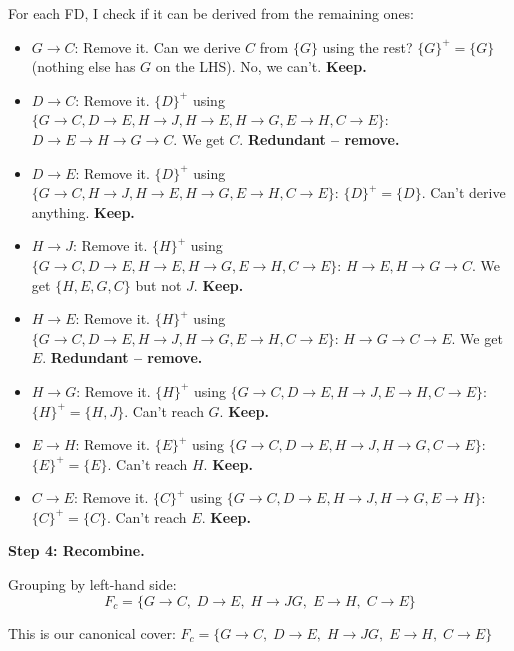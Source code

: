 \documentclass[11pt]{article}
\begin{document}
For each FD, I check if it can be derived from the remaining ones:

\begin{itemize}
  \item $G \to C$: Remove it. Can we derive $C$ from $\{G\}$ using the rest? $\{G\}^+ = \{G\}$ (nothing else has $G$ on the LHS). No, we can't. \textbf{Keep.}

  \item $D \to C$: Remove it. $\{D\}^+$ using $\{G \to C, D \to E, H \to J, H \to E, H \to G, E \to H, C \to E\}$: $D \to E \to H \to G \to C$. We get $C$. \textbf{Redundant -- remove.}

  \item $D \to E$: Remove it. $\{D\}^+$ using $\{G \to C, H \to J, H \to E, H \to G, E \to H, C \to E\}$: $\{D\}^+ = \{D\}$. Can't derive anything. \textbf{Keep.}

  \item $H \to J$: Remove it. $\{H\}^+$ using $\{G \to C, D \to E, H \to E, H \to G, E \to H, C \to E\}$: $H \to E, H \to G \to C$. We get $\{H, E, G, C\}$ but not $J$. \textbf{Keep.}

  \item $H \to E$: Remove it. $\{H\}^+$ using $\{G \to C, D \to E, H \to J, H \to G, E \to H, C \to E\}$: $H \to G \to C \to E$. We get $E$. \textbf{Redundant -- remove.}

  \item $H \to G$: Remove it. $\{H\}^+$ using $\{G \to C, D \to E, H \to J, E \to H, C \to E\}$: $\{H\}^+ = \{H, J\}$. Can't reach $G$. \textbf{Keep.}

  \item $E \to H$: Remove it. $\{E\}^+$ using $\{G \to C, D \to E, H \to J, H \to G, C \to E\}$: $\{E\}^+ = \{E\}$. Can't reach $H$. \textbf{Keep.}

  \item $C \to E$: Remove it. $\{C\}^+$ using $\{G \to C, D \to E, H \to J, H \to G, E \to H\}$: $\{C\}^+ = \{C\}$. Can't reach $E$. \textbf{Keep.}
\end{itemize}

\medskip
\noindent\textbf{Step 4: Recombine.}

Grouping by left-hand side:
\[
F_c = \{G \to C,\; D \to E,\; H \to JG,\; E \to H,\; C \to E\}
\]

This is our canonical cover: $\boxed{F_c = \{G \to C,\; D \to E,\; H \to JG,\; E \to H,\; C \to E\}}$

\end{document}
